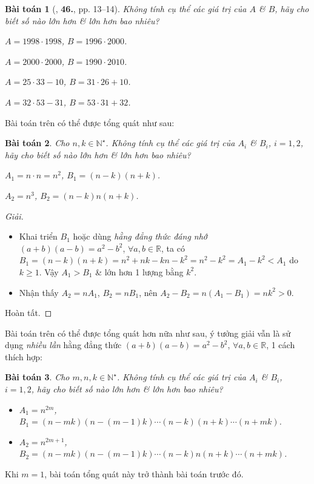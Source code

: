 \documentclass[oneside]{book}
\numberwithin{equation}{section}
\newtheorem{baitoan}{Bài toán}[section]
\begin{document}
\begin{baitoan}[\cite{Binh_Toan_6_tap_1}, \textbf{46.}, pp. 13--14]
	Không tính cụ thể các giá trị của $A$ \& $B$, hãy cho biết số nào lớn hơn \& lớn hơn bao nhiêu?
	\begin{enumerate*}
		\item[(a)] $A = 1998\cdot 1998$, $B = 1996\cdot 2000$.
		\item[(b)] $A = 2000\cdot 2000$, $B = 1990\cdot 2010$.
		\item[(c)] $A = 25\cdot 33 - 10$, $B = 31\cdot 26 + 10$.
		\item[(d)] $A = 32\cdot 53 - 31$, $B = 53\cdot 31 + 32$.
	\end{enumerate*}
\end{baitoan}
Bài toán trên có thể được tổng quát như sau:

\begin{baitoan}
	Cho $n,k\in\mathbb{N}^\star$. Không tính cụ thể các giá trị của $A_i$ \& $B_i$, $i = 1,2$, hãy cho biết số nào lớn hơn \& lớn hơn bao nhiêu?
	\begin{enumerate*}
		\item[(a)] $A_1 = n\cdot n = n^2$, $B_1 = (n - k)(n + k)$.
		\item[(b)] $A_2 = n^3$, $B_2 = (n - k)n(n + k)$.
	\end{enumerate*}	
\end{baitoan}

\begin{proof}[Giải]
	\begin{itemize}
		\item[(a)] Khai triển $B_1$ hoặc dùng \textit{hằng đẳng thức đáng nhớ} $(a + b)(a - b) = a^2 - b^2$, $\forall a,b\in\mathbb{R}$, ta có $B_1 = (n - k)(n + k) = n^2 + nk - kn - k^2 = n^2 - k^2 = A_1 - k^2 < A_1$ do $k\ge 1$. Vậy $A_1 > B_1$ \& lớn hơn 1 lượng bằng $k^2$.
		\item[(b)] Nhận thấy $A_2 = nA_1$, $B_2 = nB_1$, nên $A_2 - B_2 = n(A_1 - B_1) = nk^2 > 0$.
	\end{itemize}
	Hoàn tất.
\end{proof}
Bài toán trên có thể được tổng quát hơn nữa như sau, ý tưởng giải vẫn là sử dụng \textit{nhiều lần} hằng đẳng thức $(a + b)(a - b) = a^2 - b^2$, $\forall a,b\in\mathbb{R}$, 1 cách thích hợp:

\begin{baitoan}
	Cho $m,n,k\in\mathbb{N}^\star$. Không tính cụ thể các giá trị của $A_i$ \& $B_i$, $i = 1,2$, hãy cho biết số nào lớn hơn \& lớn hơn bao nhiêu?
	\begin{itemize}
		\item[(a)] $A_1 = n^{2m}$, $B_1 = (n - mk)(n - (m - 1)k)\cdots(n - k)(n + k)\cdots(n + mk)$.
		\item[(b)] $A_2 = n^{2m + 1}$, $B_2 = (n - mk)(n - (m - 1)k)\cdots(n - k)n(n + k)\cdots(n + mk)$.
	\end{itemize}
\end{baitoan}
Khi $m = 1$, bài toán tổng quát này trở thành bài toán trước đó.
\end{document}
